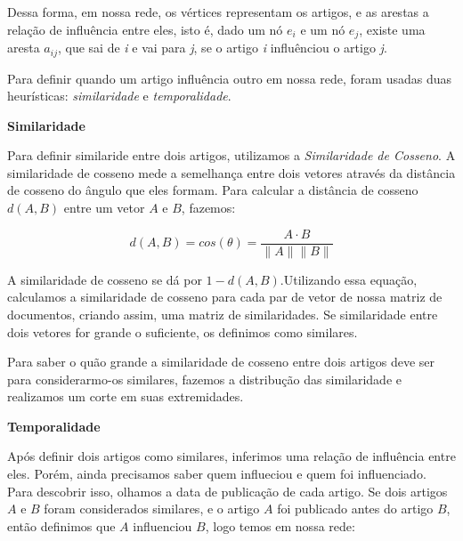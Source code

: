 \documentclass[a4paper,12pt]{article}
\begin{document}
 Dessa forma, em nossa rede, os vértices representam os artigos, e as arestas a relação de influência entre eles, isto é, dado um nó $e_{i}$ e um nó
 $e_{j}$, existe uma aresta $a_{ij}$, que sai de \textit{i} e vai para \textit{j}, se o artigo \textit{i} influênciou o artigo \textit{j}.
 
 Para definir quando um artigo influência outro em nossa rede, foram usadas duas heurísticas: \textit{similaridade} e 
 \textit{temporalidade}.
 
 \begin{description}
  \item \textbf{Similaridade}
  
    Para definir similaride entre dois artigos, utilizamos a \textit{Similaridade de Cosseno}. A similaridade de cosseno mede a semelhança entre
    dois vetores através da distância de cosseno do ângulo que eles formam. Para calcular a distância de cosseno $d(A,B)$ entre um vetor $A$ e $B$, fazemos:
    
    \begin{equation}
      d(A,B) = cos(\theta) = \dfrac{A \cdot B}{\parallel A\parallel \parallel B \parallel}
    \end{equation}

    
    A similaridade de cosseno se dá por $1-d(A,B)$.Utilizando essa equação, calculamos a similaridade de cosseno para cada
    par de vetor de nossa matriz de documentos, criando assim, uma matriz de similaridades. Se similaridade entre dois vetores for 
    grande o suficiente, os definimos como similares. 
    
    Para saber o quão grande a similaridade de cosseno entre dois artigos deve ser para considerarmo-os similares, fazemos a
    distribução das similaridade e realizamos um corte em suas extremidades.
    
    
  \item \textbf{Temporalidade}
  
    Após definir dois artigos como similares, inferimos uma relação de influência entre eles. Porém, ainda precisamos saber quem influeciou e quem
    foi influenciado. Para descobrir isso, olhamos a data de publicação de cada artigo. Se dois artigos $A$ e $B$ foram considerados 
    similares, e o artigo $A$ foi publicado antes do artigo $B$, então definimos que $A$ influenciou $B$, logo temos em nossa rede:
    

\end{description}
\end{document}
